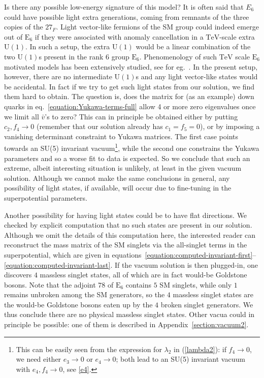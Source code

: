 \documentclass[a4paper,12pt]{article}
\def\EE{\mathrm{E}_6}
\begin{document}
Is there any possible low-energy signature of this model? It is often said that $E_6$ could have possible
light extra generations, coming from remnants of the three copies of the $27_F$.
Light vector-like fermions of the SM group could indeed emerge out of $\EE$ if
they were associated with anomaly cancellation in a $\mathrm{TeV}$-scale extra $\mathrm{U}(1)$. In such a setup, the extra $\mathrm{U}(1)$ would be a linear combination
of the two $\mathrm{U}(1)$s present in the rank $6$ group $\EE$.  Phenomenology
of such $\mathrm{TeV}$ scale $\EE$ motivated models has been extensively studied,
see for eg.~\cite{rizzo}. In the present setup, however, there are no intermediate $\mathrm{U}(1)$s and any light vector-like states would be accidental.
In fact if we try to get such light states
from our solution, we find them hard to obtain. The question is, does the matrix for (as an example)
down quarks in eq.~\eqref{equation:Yukawa-terms-full} allow 4 or more zero eigenvalues once we
limit all $\bar v$'s to zero? This can in principle be obtained either by putting $c_2,f_4\to0$ (remember that
our solution already has $c_1=f_5=0$), or by imposing a vanishing determinant constraint to Yukawa matrices.
The first case points towards an SU(5) invariant vacuum\footnote{This can be easily seen from the expression for
$\lambda_2$ in (\ref{lambda2}): if $f_4\to0$, we need either $e_3\to0$ or $e_4\to0$; both lead to an SU(5) invariant
vacuum with $e_4,f_4\to0$, see \eqref{e4}.}, while the second one
constrains the Yukawa parameters and so a worse fit to data is expected. So we conclude that
such an extreme, albeit interesting situation is unlikely, at least in the given vacuum solution.
Although we cannot make the same conclusions in general, any possibility of light states, if available, will occur due to
fine-tuning in the superpotential parameters.

Another possibility for having light states could be to have flat directions. We checked by explicit computation that no such states are present in our solution. Although we omit the details of this computation here, the interested reader can reconstruct the mass matrix of the SM singlets via the all-singlet terms in the superpotential, which are given in equations~\eqref{equation:computed-invariant-first}--\eqref{equation:computed-invariant-last}. If the vacuum solution is then plugged-in, one discovers $4$ massless singlet states, all of which are in fact would-be Goldstone bosons. Note that the adjoint $78$ of $\EE$ contains $5$ SM singlets, while only $1$ remains unbroken among the SM generators, so the $4$ massless singlet states are the would-be Goldstone bosons eaten up by the $4$ broken singlet generators. We thus conclude there are no physical massless singlet states.
Other vacua could in principle be possible: one of them is described in Appendix~\ref{section:vacuum2}.
\end{document}
